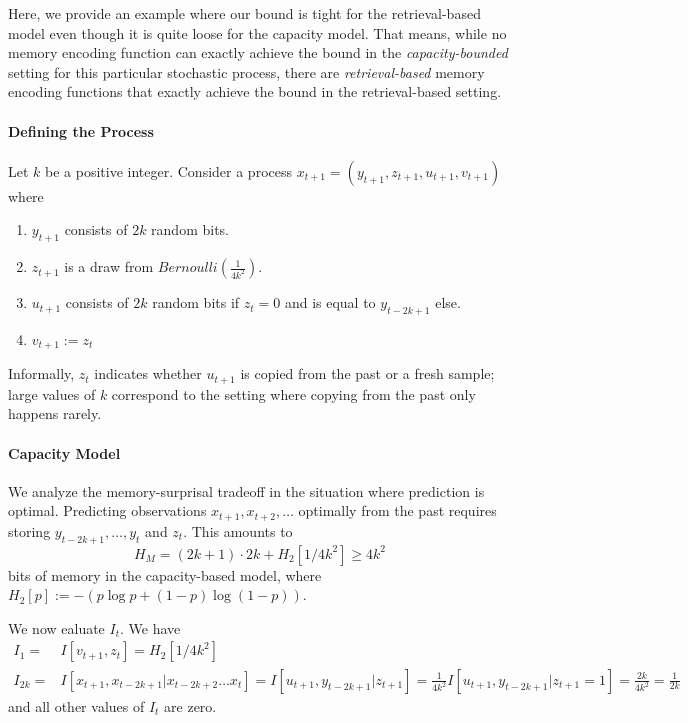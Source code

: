 \documentclass[11pt,letterpaper]{article}
\begin{document}
Here, we provide an example where our bound is tight for the retrieval-based model even though it is quite loose for the capacity model.
That means, while no memory encoding function can exactly achieve the bound in the \emph{capacity-bounded} setting for this particular stochastic process, there are \emph{retrieval-based} memory encoding functions that exactly achieve the bound in the retrieval-based setting.

\paragraph{Defining the Process}
Let $k$ be a positive integer.
Consider a process $x_{t+1} = (y_{t+1}, z_{t+1}, u_{t+1}, v_{t+1})$ where
\begin{enumerate}
    \item $y_{t+1}$ consists of $2k$ random bits.
    \item $z_{t+1}$ is a draw from $Bernoulli(\frac{1}{4k^2})$.
    \item $u_{t+1}$ consists of $2k$ random bits if $z_t = 0$ and is equal to $y_{t-2k+1}$ else.
    \item $v_{t+1} := z_t$ 
\end{enumerate}
Informally, $z_t$ indicates whether $u_{t+1}$ is copied from the past or a fresh sample; large values of $k$ correspond to the setting where copying from the past only happens rarely.

\paragraph{Capacity Model}
We analyze the memory-surprisal tradeoff in the situation where prediction is optimal.
Predicting observations $x_{t+1}, x_{t+2}, \dots$ optimally from the past requires storing $y_{t-2k+1}, \dots, y_{t}$ and $z_t$.
This amounts to
\begin{equation}
    H_M = (2k+1)\cdot 2k + H_2[1/4k^2] \geq 4k^2
\end{equation} 
bits of memory in the capacity-based model, where $H_2[p] := -(p\log p + (1-p) \log (1-p))$.

We now ealuate $I_t$. We have
\begin{align}
I_1 =& I[v_{t+1}, z_t] = H_2[1/4k^2] \\
   I_{2k} =& I[x_{t+1}, x_{t-2k+1}|x_{t-2k+2}\dots x_t] = I[u_{t+1}, y_{t-2k+1}|z_{t+1}] = \frac{1}{4k^2} I[u_{t+1}, y_{t-2k+1}|z_{t+1}=1] = \frac{2k}{4k^2} = \frac{1}{2k} 
\end{align}
and all other values of $I_t$ are zero.
\end{document}
